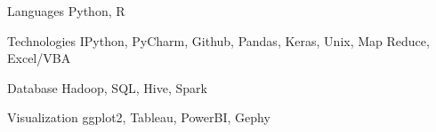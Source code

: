 

\begin{cvskills}

  \cvskill
    {Languages} %
    {Python, R} %

  \cvskill
    {Technologies} %
    {IPython, PyCharm, Github, Pandas, Keras, Unix, Map Reduce, Excel/VBA} %

  \cvskill
    {Database} %
    {Hadoop, SQL, Hive, Spark} %
    
  \cvskill
    {Visualization} %
    {ggplot2, Tableau, PowerBI, Gephy}
    
\end{cvskills}
